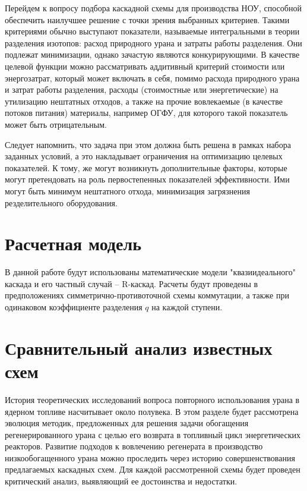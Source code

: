 Перейдем к вопросу подбора каскадной схемы для производства НОУ, способной обеспечить наилучшее решение с точки зрения выбранных критериев.
Такими критериями обычно выступают показатели, называемые интегральными в теории разделения изотопов: расход природного урана и затраты работы разделения.
Они подлежат минимизации, однако зачастую являются конкурирующими.
В качестве целевой функции можно рассматривать аддитивный критерий стоимости или энергозатрат, который может включать в себя, помимо расхода природного урана и затрат работы разделения, расходы (стоимостные или энергетические) на утилизацию нештатных отходов, а также на прочие вовлекаемые (в качестве потоков питания) материалы, например ОГФУ, для которого такой показатель может быть отрицательным.

Следует напомнить, что задача при этом должна быть решена в рамках набора заданных условий, а это накладывает ограничения на оптимизацию целевых показателей.
К тому, же могут возникнуть дополнительные факторы, которые могут претендовать на роль первостепенных показателей эффективности.
Ими могут быть минимум нештатного отхода, минимизация загрязнения резделительного оборудования.

\section{Расчетная модель}

В данной работе будут использованы математические модели "квазиидеального" каскада и его частный случай -- R-каскад. Расчеты будут проведены в предположениях симметрично-противоточной схемы коммутации, а также при одинаковом коэффициенте разделения $q$ на каждой ступени.

\section{Сравнительный анализ известных схем}

История теоретических исследований вопроса повторного использования урана в ядерном топливе насчитывает около полувека.
В этом разделе будет рассмотрена эволюция методик, предложенных для решения задачи обогащения регенерированного урана с целью его возврата в топливный цикл энергетических реакторов.
Развитие подходов к вовлечению регенерата в производство низкообогащенного урана можно проследить через историю совершенствования предлагаемых каскадных схем.
Для каждой рассмотренной схемы будет проведен критический анализ, выявляющий ее достоинства и недостатки.

